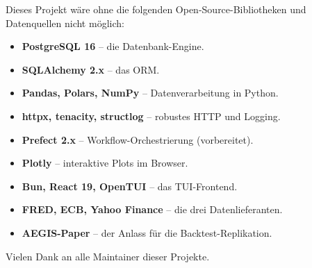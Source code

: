 Dieses Projekt wäre ohne die folgenden Open-Source-Bibliotheken und
Datenquellen nicht möglich:

\begin{itemize}
  \item \textbf{PostgreSQL 16} -- die Datenbank-Engine.
  \item \textbf{SQLAlchemy 2.x} -- das ORM.
  \item \textbf{Pandas, Polars, NumPy} -- Datenverarbeitung in Python.
  \item \textbf{httpx, tenacity, structlog} -- robustes HTTP und Logging.
  \item \textbf{Prefect 2.x} -- Workflow-Orchestrierung (vorbereitet).
  \item \textbf{Plotly} -- interaktive Plots im Browser.
  \item \textbf{Bun, React 19, OpenTUI} -- das TUI-Frontend.
  \item \textbf{FRED, ECB, Yahoo Finance} -- die drei Datenlieferanten.
  \item \textbf{AEGIS-Paper} -- der Anlass für die Backtest-Replikation.
\end{itemize}

Vielen Dank an alle Maintainer dieser Projekte.

